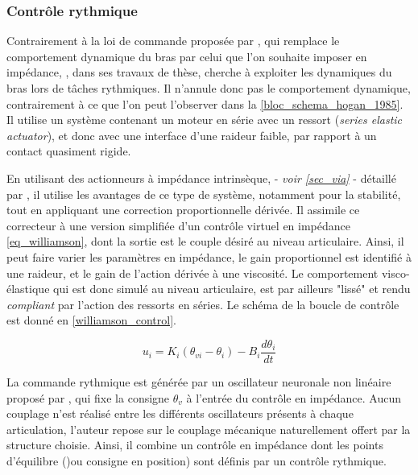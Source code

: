\documentclass[12pt, a4paper]{article} %
\begin{document}
\subsubsection{Contrôle rythmique} \label{sec_imp_ctrl_ryth}

Contrairement à la loi de commande proposée par \cite{hogan_impedance_1985}, qui remplace le comportement dynamique du bras par celui que l'on souhaite imposer en impédance, \cite{williamson_neural_1998, williamson_robot_1999}, dans ses travaux de thèse, cherche à exploiter les dynamiques du bras lors de tâches rythmiques. Il n'annule donc pas le comportement dynamique, contrairement à ce que l'on peut l'observer dans la \cref{bloc_schema_hogan_1985}. Il utilise un système contenant un moteur en série avec un ressort (\textit{series elastic actuator}), et donc avec une interface d'une raideur faible, par rapport à un contact quasiment rigide.

\newlineBlank 

En utilisant des actionneurs à impédance intrinsèque, - \textit{voir \cref{sec_via}} - détaillé par \cite{pratt_series_1995}, il utilise les avantages de ce type de système, notamment pour la stabilité, tout en appliquant une correction proportionnelle dérivée. Il assimile ce correcteur à une version simplifiée d'un contrôle virtuel en impédance \cref{eq_williamson}, dont la sortie est le couple désiré au niveau articulaire. Ainsi, il peut faire varier les paramètres en impédance, le gain proportionnel est identifié à une raideur, et le gain de l'action dérivée à une viscosité. Le comportement visco-élastique qui est donc simulé au niveau articulaire, est par ailleurs "lissé" et rendu \textit{compliant} par l'action des ressorts en séries. Le schéma de la boucle de contrôle est donné en \cref{williamson_control}. 

\begin{equation} \label{eq_williamson}
u_i = K_i (\theta_{vi} - \theta_i) - B_i \frac{d\theta_i}{dt}
\end{equation}

\newlineBlank 

La commande rythmique est générée par un oscillateur neuronale non linéaire proposé par \cite{matsuoka_sustained_1985}, qui fixe la consigne $\theta_v$ à l'entrée du contrôle en impédance. Aucun couplage n'est réalisé entre les différents oscillateurs présents à chaque articulation, l'auteur repose sur le couplage mécanique naturellement offert par la structure choisie. Ainsi, il combine un contrôle en impédance dont les points d'équilibre ()ou consigne en position) sont définis par un contrôle rythmique.
\end{document}
